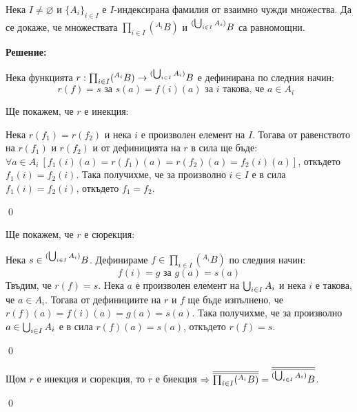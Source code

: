 \begin{problem}
Нека $I \ne \varnothing$ и $\{A_i\}_{i \in I}$ е $I$-индексирана фамилия от взаимно чужди множества.
Да се докаже, че множествата $\prod_{i \in I} ({}^{A_i} B)$ и ${}^{(\bigcup_{i \in I} A_i)} B$ са равномощни.
\end{problem}

\textbf{Решение:}

\smallbreak
\quad
Нека функцията
$r: \prod_{i \in I} ({}^{A_i} B) \to {}^{(\bigcup_{i \in I} A_i)} B$
е дефинирана по следния начин:
\[
r(f) = s \text{ за }
s(a) = f(i)(a) \text{ за $i$ такова, че $a \in A_i$ }
\]

Ще покажем, че $r$ е инекция:

\begin{tcolorbox}[mybox={Доказателство:}]
\quad
Нека $r(f_1) = r(f_2)$ и нека $i$ е произволен елемент на $I$.
Тогава от равенството на $r(f_1)$ и $r(f_2)$ и от дефиницията на $r$ в сила ще бъде:
$\forall a \in A_i\ [ f_1(i)(a) = r(f_1)(a) = r(f_2)(a) = f_2(i)(a)]$,
откъдето $f_1(i) = f_2(i)$.
Така получихме, че за произволно $i \in I$ е в сила $f_1(i) = f_2(i)$, откъдето
$f_1 = f_2$.

\qed
\end{tcolorbox}

\quad
Ще покажем, че $r$ е сюрекция:

\begin{tcolorbox}[mybox={Доказателство:}]
\quad
Нека $s \in {}^{(\bigcup_{i \in I} A_i)} B$.
Дефинираме $f \in \prod_{i \in I} ({}^{A_i} B)$ по следния начин:
\[
f(i) = g \text{ за }
g(a) = s(a)
\]
\quad
Твъдим, че $r(f) = s$.
Нека $a$ е произволен елемент на $\bigcup_{i \in I} A_i$ и нека $i$ е такова, че $a \in A_i$.
Тогава от дефинициите на $r$ и $f$ ще бъде изпълнено, че $r(f)(a) = f(i)(a) = g(a) = s(a)$.
Така получихме, че за произволно $a \in \bigcup_{i \in I} A_i$ е в сила $r(f)(a) = s(a)$, откъдето $r(f) = s$.

\qed
\end{tcolorbox}


\quad
Щом $r$ е инекция и сюрекция, то $r$ е биекция
$\Rightarrow \overline{\overline{\prod_{i \in I} ({}^{A_i} B)}} = \overline{\overline{{}^{(\bigcup_{i \in I} A_i)} B}}$.

\qed
